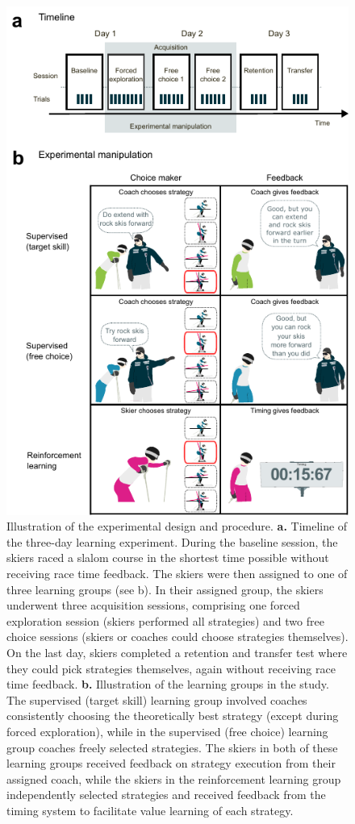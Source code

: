 \begin{figure}[H]
\centering
\includegraphics{figure_method_experiment.pdf}
\caption{Illustration of the experimental design and procedure. \textbf{a.} Timeline of the three-day learning experiment. During the baseline session, the skiers raced a slalom course in the shortest time possible without receiving race time feedback. The skiers were then assigned to one of three learning groups (see b). In their assigned group, the skiers underwent three acquisition sessions, comprising one forced exploration session (skiers performed all strategies) and two free choice sessions (skiers or coaches could choose strategies themselves). On the last day, skiers completed a retention and transfer test where they could pick strategies themselves, again without receiving race time feedback. \textbf{b.} Illustration of the learning groups in the study. The supervised (target skill) learning group involved coaches consistently choosing the theoretically best strategy (except during forced exploration), while in the supervised (free choice) learning group coaches freely selected strategies. The skiers in both of these learning groups received feedback on strategy execution from their assigned coach, while the skiers in the reinforcement learning group independently selected strategies and received feedback from the timing system to facilitate value learning of each strategy.}\label{fig: rlillustration}
\end{figure}


